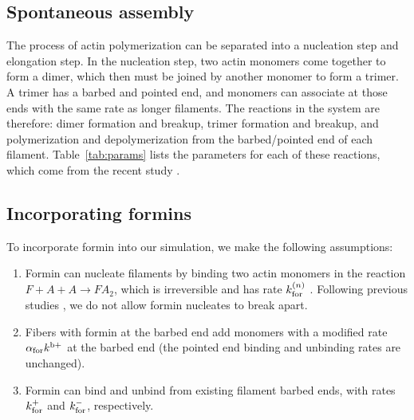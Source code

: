 \documentclass[11pt]{article}
\begin{document}
\subsection{Spontaneous assembly}
The process of actin polymerization can be separated into a nucleation step and elongation step. In the nucleation step, two actin monomers come together to form a dimer, which then must be joined by another monomer to form a trimer. A trimer has a barbed and pointed end, and monomers can associate at those ends with the same rate as longer filaments. The reactions in the system are therefore: dimer formation and breakup, trimer formation and breakup, and polymerization and depolymerization from the barbed/pointed end of each filament. Table\ \ref{tab:params} lists the parameters for each of these reactions, which come from the recent study \cite{rosenbloom2021mechanism}.

\subsection{Incorporating formins \label{sec:formin}}
To incorporate formin into our simulation, we make the following assumptions:
\begin{enumerate}
\item Formin can nucleate filaments by binding two actin monomers in the reaction $F+A+A \rightarrow FA_2$, which is irreversible and has rate $k_\text{for}^{(n)}$ \cite{paul2008role, zweifel2021nucleation}. Following previous studies \cite{paul2008role, zweifel2021nucleation}, we do not allow formin nucleates to break apart.
\item Fibers with formin at the barbed end add monomers with a modified rate $\alpha_\text{for} k^\text{b+}$ at the barbed end (the pointed end binding and unbinding rates are unchanged). 
\item Formin can bind and unbind from existing filament barbed ends, with rates $k_\text{for}^+$ and $k_\text{for}^-$, respectively. 
\end{enumerate}
\end{document}
